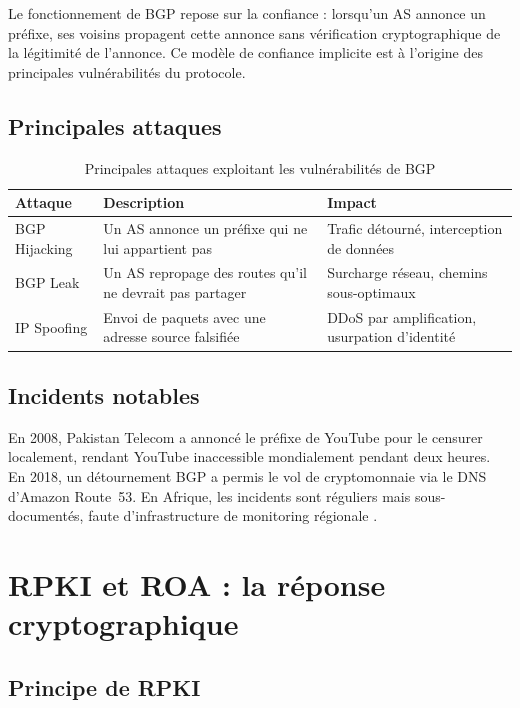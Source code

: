 \documentclass{eneam}
\begin{document}
Le fonctionnement de BGP repose sur la confiance : lorsqu'un AS annonce un préfixe, ses voisins propagent cette annonce sans vérification cryptographique de la légitimité de l'annonce. Ce modèle de confiance implicite est à l'origine des principales vulnérabilités du protocole.

\subsection{Principales attaques}

\begin{table}[H]
\caption{Principales attaques exploitant les vulnérabilités de BGP}
\centering
\begin{tabularx}{\textwidth}{|l|X|X|}
\hline
\textbf{Attaque} & \textbf{Description} & \textbf{Impact} \\
\hline
BGP Hijacking & Un AS annonce un préfixe qui ne lui appartient pas & Trafic détourné, interception de données \\
\hline
BGP Leak & Un AS repropage des routes qu'il ne devrait pas partager & Surcharge réseau, chemins sous-optimaux \\
\hline
IP Spoofing & Envoi de paquets avec une adresse source falsifiée & DDoS par amplification, usurpation d'identité \\
\hline
\end{tabularx}
\end{table}

\subsection{Incidents notables}

En 2008, Pakistan Telecom a annoncé le préfixe de YouTube pour le censurer localement, rendant YouTube inaccessible mondialement pendant deux heures. En 2018, un détournement BGP a permis le vol de cryptomonnaie via le DNS d'Amazon Route~53. En Afrique, les incidents sont réguliers mais sous-documentés, faute d'infrastructure de monitoring régionale \cite{BGPStream}.

\section{RPKI et ROA : la réponse cryptographique}

\subsection{Principe de RPKI}
\end{document}
